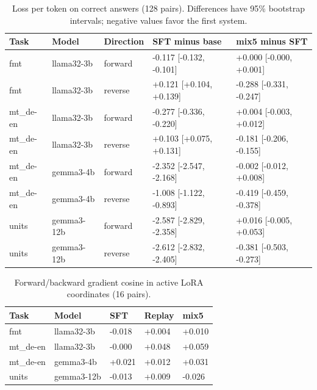 \begin{table}[t]
\centering\small
\begin{tabular}{lllll}
\toprule
Task & Model & Direction & SFT minus base & mix5 minus SFT \\
\midrule
fmt & llama32-3b & forward & -0.117 [-0.132, -0.101] & +0.000 [-0.000, +0.001] \\
fmt & llama32-3b & reverse & +0.121 [+0.104, +0.139] & -0.288 [-0.331, -0.247] \\
mt\_de-en & llama32-3b & forward & -0.277 [-0.336, -0.220] & +0.004 [-0.003, +0.012] \\
mt\_de-en & llama32-3b & reverse & +0.103 [+0.075, +0.131] & -0.181 [-0.206, -0.155] \\
mt\_de-en & gemma3-4b & forward & -2.352 [-2.547, -2.168] & -0.002 [-0.012, +0.008] \\
mt\_de-en & gemma3-4b & reverse & -1.008 [-1.122, -0.893] & -0.419 [-0.459, -0.378] \\
units & gemma3-12b & forward & -2.587 [-2.829, -2.358] & +0.016 [-0.005, +0.053] \\
units & gemma3-12b & reverse & -2.612 [-2.832, -2.405] & -0.381 [-0.503, -0.273] \\
\bottomrule
\end{tabular}
\caption{Loss per token on correct answers (128 pairs). Differences have 95\% bootstrap intervals; negative values favor the first system.}
\label{tab:sprint-likelihood}
\end{table}
\begin{table}[t]
\centering\small
\begin{tabular}{lllll}
\toprule
Task & Model & SFT & Replay & mix5 \\
\midrule
fmt & llama32-3b & -0.018 & +0.004 & +0.010 \\
mt\_de-en & llama32-3b & -0.000 & +0.048 & +0.059 \\
mt\_de-en & gemma3-4b & +0.021 & +0.012 & +0.031 \\
units & gemma3-12b & -0.013 & +0.009 & -0.026 \\
\bottomrule
\end{tabular}
\caption{Forward/backward gradient cosine in active LoRA coordinates (16 pairs).}
\label{tab:sprint-gradients}
\end{table}
